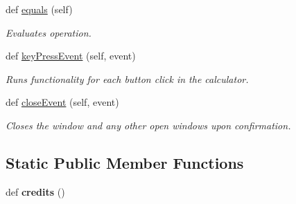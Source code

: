 \begin{DoxyCompactItemize}
def \hyperlink{classmain_1_1_main_window_a153d3cd5e2476e7f262d67600c77c1fc}{equals} (self)
\begin{DoxyCompactList}\small\item\em Evaluates operation. \end{DoxyCompactList}\item 
def \hyperlink{classmain_1_1_main_window_a298fe7db20162628212e8f665dc098f5}{key\+Press\+Event} (self, event)
\begin{DoxyCompactList}\small\item\em Runs functionality for each button click in the calculator. \end{DoxyCompactList}\item 
\mbox{\label{classmain_1_1_main_window_a3c04a08e06ea9c36d998e3ee7ad99b30}} 
def \hyperlink{classmain_1_1_main_window_a3c04a08e06ea9c36d998e3ee7ad99b30}{close\+Event} (self, event)
\begin{DoxyCompactList}\small\item\em Closes the window and any other open windows upon confirmation. \end{DoxyCompactList}\end{DoxyCompactItemize}
\subsection*{Static Public Member Functions}
\begin{DoxyCompactItemize}
\item 
\mbox{\label{classmain_1_1_main_window_afbb14c9b37e09c14dff3f018c9a5d65a}} 
def {\bfseries credits} ()
\end{DoxyCompactItemize}
